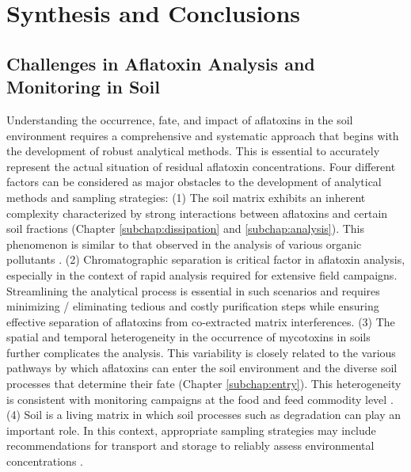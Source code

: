 \chapter{Synthesis and Conclusions } \label{Chapter6}  

\clearpage

\section{Challenges in Aflatoxin Analysis and Monitoring in Soil} \label{subchap:synthesis_analysis}

Understanding the occurrence, fate, and impact of aflatoxins in the soil environment requires a comprehensive and systematic approach that begins with the development of robust analytical methods. This is essential to accurately represent the actual situation of residual aflatoxin concentrations. Four different factors can be considered as major obstacles to the development of analytical methods and sampling strategies: (1) The soil matrix exhibits an inherent complexity characterized by strong interactions between aflatoxins and certain soil fractions (Chapter \ref{subchap:dissipation} and \ref{subchap:analysis}). This phenomenon is similar to that observed in the analysis of various organic pollutants \citep{trellu2016removal}. (2) Chromatographic separation is critical factor in aflatoxin analysis, especially in the context of rapid analysis required for extensive field campaigns. Streamlining the analytical process is essential in such scenarios and requires minimizing / eliminating tedious and costly purification steps while ensuring effective separation of aflatoxins from co-extracted matrix interferences. (3) The spatial and temporal heterogeneity in the occurrence of mycotoxins in soils further complicates the analysis. This variability is closely related to the various pathways by which aflatoxins can enter the soil environment and the diverse soil processes that determine their fate (Chapter \ref{subchap:entry}). This heterogeneity is consistent with monitoring campaigns at the food and feed commodity level \citep{miraglia2005role}. (4) Soil is a living matrix in which soil processes such as degradation can play an important role. In this context, appropriate sampling strategies may include recommendations for transport and storage to reliably assess environmental concentrations \citep{wagner1995basic}.

